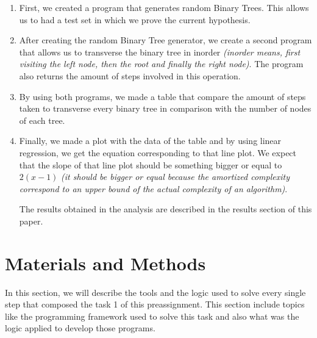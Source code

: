 \documentclass[12p]{report}
\begin{document}
\begin{enumerate}

  \item First, we created a program that generates random Binary Trees. This allows us to had a test set in which we prove the current hypothesis.
  \item After creating the random Binary Tree generator, we create a second program that allows us to transverse the binary tree in inorder \textit{(inorder means, first visiting the left node, then the root and finally the right node)}. The program also returns the amount of steps involved in this operation.
  \item By using both programs, we made a table that compare the amount of steps taken to transverse every binary tree in comparison with the number of nodes of each tree.
  \item Finally, we made a plot with the data of the table and by using linear regression, we get the equation corresponding to that line plot. We expect that the slope of that line plot should be something bigger or equal to $2(x-1)$ \textit{(it should be bigger or equal because the amortized complexity correspond to an upper bound of the actual complexity of an algorithm)}.

\bigskip

The results obtained in the analysis are described in the results section of this paper.

\end{enumerate}



  \section{Materials and Methods}
In this section, we will describe the tools and the logic used to solve every single step that composed the task 1 of this preassignment. This section include topics like the programming framework used to solve this task and also what was the logic applied to develop those programs.


\end{document}
